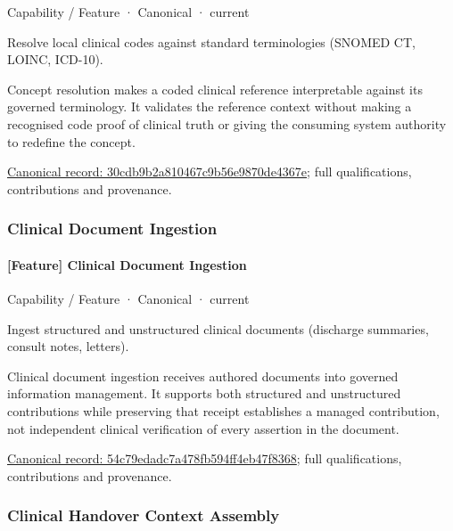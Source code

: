 \label{element:30cdb9b2a810467c9b56e9870de4367e}
{\small Capability / Feature · Canonical · current}\par

Resolve local clinical codes against standard terminologies (SNOMED CT, LOINC, ICD-10).



Concept resolution makes a coded clinical reference interpretable against its governed terminology. It validates the reference context without making a recognised code proof of clinical truth or giving the consuming system authority to redefine the concept.


{\footnotesize \href{../../../../continuum/strategy/capability/feature/30cdb9b2a810467c9b56e9870de4367e.md}{Canonical record: 30cdb9b2a810467c9b56e9870de4367e}; full qualifications, contributions and provenance.}\par
\subsubsection{Clinical Document Ingestion}

\paragraph{[Feature] Clinical Document Ingestion}

\label{element:54c79edadc7a478fb594ff4eb47f8368}
{\small Capability / Feature · Canonical · current}\par

Ingest structured and unstructured clinical documents (discharge summaries, consult notes, letters).



Clinical document ingestion receives authored documents into governed information management. It supports both structured and unstructured contributions while preserving that receipt establishes a managed contribution, not independent clinical verification of every assertion in the document.


{\footnotesize \href{../../../../continuum/strategy/capability/feature/54c79edadc7a478fb594ff4eb47f8368.md}{Canonical record: 54c79edadc7a478fb594ff4eb47f8368}; full qualifications, contributions and provenance.}\par
\subsubsection{Clinical Handover Context Assembly}

